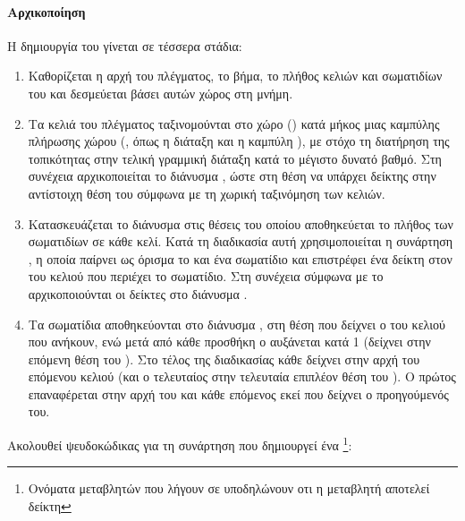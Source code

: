 \paragraph{Αρχικοποίηση} Η δημιουργία του  γίνεται σε τέσσερα στάδια:
\begin{enumerate}
\item Καθορίζεται η αρχή του πλέγματος, το βήμα, το πλήθος κελιών και σωματιδίων του και
  δεσμεύεται βάσει αυτών χώρος στη μνήμη.

\item Τα κελιά του πλέγματος ταξινομούνται στο χώρο () κατά μήκος μιας
  καμπύλης πλήρωσης χώρου (, όπως η διάταξη  και η καμπύλη
  ), με στόχο τη διατήρηση της τοπικότητας στην τελική γραμμική διάταξη κατά
  το μέγιστο δυνατό βαθμό. Στη συνέχεια αρχικοποιείται το διάνυσμα , ώστε στη
  θέση  να υπάρχει δείκτης στην αντίστοιχη θέση του
   σύμφωνα με τη χωρική ταξινόμηση των κελιών.

\item Κατασκευάζεται το διάνυσμα  στις θέσεις του οποίου αποθηκεύεται το
  πλήθος των σωματιδίων σε κάθε κελί. Κατά τη διαδικασία αυτή χρησιμοποιείται η συνάρτηση
  , η οποία παίρ\-νει ως όρισμα το  και ένα σωματίδιο
  και επιστρέφει ένα δείκτη στον  του κελιού που περιέχει το σωματίδιο. Στη
  συνέχεια σύμφωνα με το  αρχικοποιούνται οι δείκτες στο διάνυσμα
  .

\item Τα σωματίδια αποθηκεύονται στο διάνυσμα , στη θέση που δείχνει ο
   του κελιού που ανήκουν, ενώ μετά από κάθε προσθήκη ο  αυξάνεται
  κατά 1 (δείχνει στην επόμενη θέση του ). Στο τέλος της διαδικασίας κάθε
   δείχνει στην αρχή του επόμενου κελιού (και ο τελευταίος στην τελευταία
  επιπλέον θέση του ). Ο πρώτος  επαναφέρεται στην αρχή του
   και κάθε επόμενος εκεί που δείχνει ο προηγούμενός του.
\end{enumerate}
Ακολουθεί ψευδοκώδικας για τη συνάρτηση  που δημιουργεί ένα
\footnote{Ονόματα μεταβλητών που λήγουν σε  υποδηλώνουν οτι η
  μεταβλητή αποτελεί δείκτη}: 
